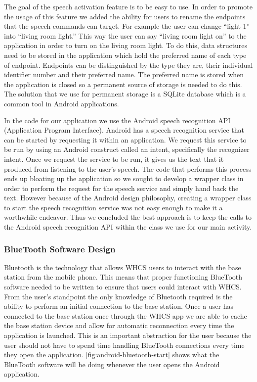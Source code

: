 The goal of the speech activation feature is to be easy to use. In order to
promote the usage of this feature we added the ability for users to rename
the endpoints that the speech commands can target. For example the user can
change {}``light 1'' into {}``living room light.'' This way the user can say
{}``living room light on{}'' to the application in order to turn on the living
room light. To do this, data structures need to be stored in the
application which hold the preferred name of each type of endpoint. Endpoints
can be distinguished by the type they are, their individual identifier number
and their preferred name. The preferred name is stored when the
application is closed so a permanent source of storage is needed to do this. The solution that we use for permanent storage is a SQLite database which is a common tool in Android applications.

In the code for our application we use the Android speech recognition
API (Application Program Interface).  Android has a speech recognition service
that can be started by requesting it within an application. We request
this service to be run by using an Android construct called an intent,
specifically the recognizer intent. Once we request the service to be run, it
gives us the text that it produced from listening to the user{}'s speech. The
code that performs this process ends up bloating up the application so we
sought to develop a wrapper class in order to perform the request for the
speech service and simply hand back the text. However because of the Android
design philosophy, creating a wrapper class to start the speech recognition
service was not easy enough to make it a worthwhile endeavor. Thus we
concluded the best approach is to keep the calls to the Android speech
recognition API within the class we use for our main activity.

\subsubsection{BlueTooth Software Design} Bluetooth is the technology that
allows WHCS users to interact with the base station from the mobile phone. This
means that proper functioning BlueTooth software needed to be written to ensure that
users could interact with WHCS. From the user{}'s standpoint the only knowledge
of Bluetooth required is the ability to perform an initial connection to
the base station. Once a user has connected to the base station once through
the WHCS app we are able to cache the base station device and allow for
automatic reconnection every time the application is launched. This is an
important abstraction for the user because the user should not have to spend
time handling BlueTooth connections every time they open the application.
\autoref{fig:android-bluetooth-start} shows what the BlueTooth software will be
doing whenever the user opens the Android application.

